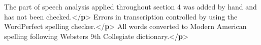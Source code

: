 \begin{shaded}
\mbox{}\newline 
{}\mbox{}\newline 
\hspace*{1em}The part of speech analysis applied throughout section 4 was\mbox{}\newline 
\hspace*{1em}\hspace*{1em}\hspace*{1em}\hspace*{1em} added by hand and has not been checked.{</\textbf{p}>}\mbox{}\newline 
{}\mbox{}\newline 
{}\mbox{}\newline 
\hspace*{1em}Errors in transcription controlled by using the\mbox{}\newline 
\hspace*{1em}\hspace*{1em}\hspace*{1em}\hspace*{1em} WordPerfect spelling checker.{</\textbf{p}>}\mbox{}\newline 
{}\mbox{}\newline 
{}\mbox{}\newline 
\hspace*{1em}All words converted to Modern American spelling following\mbox{}\newline 
\hspace*{1em}\hspace*{1em}\hspace*{1em}\hspace*{1em} Websters 9th Collegiate dictionary.{</\textbf{p}>}\mbox{}\newline 
{}\mbox{}\newline 

\end{shaded}
